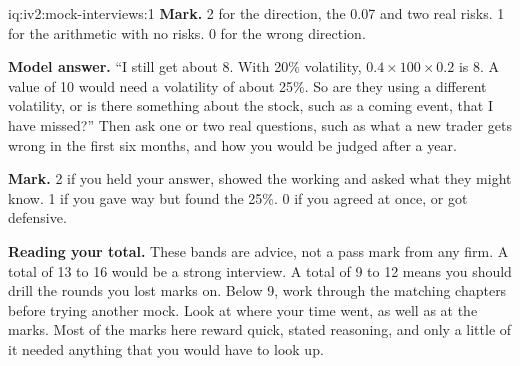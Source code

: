 \begin{solution}{iq:iv2:mock-interviews:1}
\textbf{Mark.} 2 for the direction, the 0.07 and two real risks. 1 for the arithmetic with no risks. 0 for the wrong direction.

\ivstop
\textbf{Model answer.} ``I still get about 8. With 20\% volatility, $0.4 \times 100 \times 0.2$ is 8. A value of 10 would need a volatility of about 25\%. So are they using a different volatility, or is there something about the stock, such as a coming event, that I have missed?'' Then ask one or two real questions, such as what a new trader gets wrong in the first six months, and how you would be judged after a year.

\textbf{Mark.} 2 if you held your answer, showed the working and asked what they might know. 1 if you gave way but found the 25\%. 0 if you agreed at once, or got defensive.

\medskip
\textbf{Reading your total.} These bands are advice, not a pass mark from any firm. A total of 13 to 16 would be a strong interview. A total of 9 to 12 means you should drill the rounds you lost marks on. Below 9, work through the matching chapters before trying another mock. Look at where your time went, as well as at the marks. Most of the marks here reward quick, stated reasoning, and only a little of it needed anything that you would have to look up.

\end{solution}

